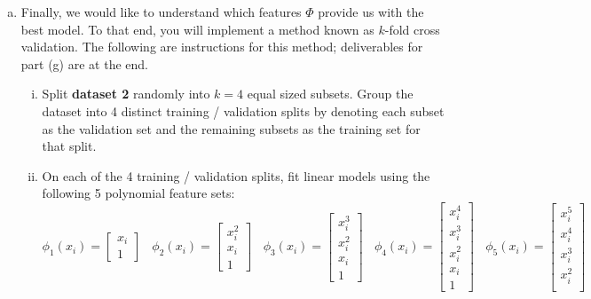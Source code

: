 \documentclass{article}
\begin{document}
\begin{enumerate}[(a)]
    \item
    Finally, we would like to understand which features $\Phi$ provide us with the best model. 
    To that end, you will implement a method known as $k$-fold cross validation. 
    The following are instructions for this method; deliverables for part (g) are at the end.
    \begin{enumerate}[(i)]
        \item 
        Split \textbf{dataset 2} randomly into $k=4$ equal sized subsets. 
        Group the dataset into 4 distinct training / validation splits by denoting each subset as the validation set and the remaining subsets as the training set for that split.
        \item 
        On each of the 4 training / validation splits, fit linear models using the following 5 polynomial feature sets:
        \[
            \phi_1(x_i) = \begin{bmatrix}
                x_i \\
                1
            \end{bmatrix}
            ~~~~
            \phi_2(x_i) = \begin{bmatrix}
                x_i^2 \\
                x_i \\
                1
            \end{bmatrix}
            ~~~~
            \phi_3(x_i) = \begin{bmatrix}
                x_i^3 \\
                x_i^2 \\
                x_i \\
                1
            \end{bmatrix}
            ~~~~
            \phi_4(x_i) = \begin{bmatrix}
                x_i^4 \\
                x_i^3 \\
                x_i^2 \\
                x_i \\
                1
            \end{bmatrix}
            ~~~~
            \phi_5(x_i) = \begin{bmatrix}
                x_i^5 \\
                x_i^4 \\
                x_i^3 \\
                x_i^2 \\

\end{bmatrix}\]
\end{enumerate}
\end{enumerate}
\end{document}
